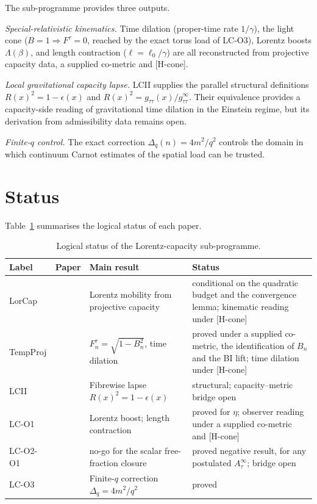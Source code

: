 \documentclass[12pt,a4paper]{article}
\theoremstyle{remark}
\begin{document}
    The sub-programme provides three outputs.

    \textit{Special-relativistic kinematics.}
    Time dilation (proper-time rate $1/\gamma$), the light cone ($B = 1 \Rightarrow F^\tau = 0$, reached by the
    exact torus load of LC-O3),
    Lorentz boosts $\Lambda(\beta)$, and length contraction ($\ell = \ell_0/\gamma$) are all
    reconstructed from projective capacity data, a supplied co-metric and [H-cone].

    \textit{Local gravitational capacity lapse.}
    LCII supplies the parallel structural definitions
    $R(x)^2 = 1-\epsilon(x)$ and $R(x)^2 = g_{\tau\tau}(x)/g_{\tau\tau}^\infty$.
    Their equivalence provides a capacity-side reading of gravitational time dilation in the
    Einstein regime, but its derivation from admissibility data remains open.

    \textit{Finite-$q$ control.}
    The exact correction $\Delta_q(n) = 4m^2/q^2$ controls the domain in which continuum Carnot
    estimates of the spatial load can be trusted.

  \section{Status}
  \label{sec:status}

  Table~\ref{tab:status} summarises the logical status of each paper.

  \begin{table}[h]
    \centering
    \caption{Logical status of the Lorentz-capacity sub-programme.}
    \label{tab:status}
    \smallskip
    \footnotesize
    \begin{tabular}{llp{4.5cm}p{4cm}}
      \toprule
      Label & Paper & Main result & Status \\
      \midrule
      LorCap & \cite{Beau2026n} & Lorentz mobility from projective capacity
      & conditional on the quadratic budget and the convergence lemma; kinematic reading under [H-cone] \\
      TempProj & \cite{Beau2026tp} & $F^\tau_n = \sqrt{1-B_n^2}$, time dilation
      & proved under a supplied co-metric, the identification of $B_n$ and the BI lift; time dilation under
      [H-cone] \\
      LCII & \cite{Beau2026lco2} & Fibrewise lapse $R(x)^2 = 1-\epsilon(x)$
      & structural; capacity--metric bridge open \\
      LC-O1 & \cite{Beau2026lco1} & Lorentz boost; length contraction
      & proved for $\eta$; observer reading under a supplied co-metric and [H-cone] \\
      LC-O2-O1 & \cite{Beau2026lco2o1} & no-go for the scalar free-fraction closure
      & proved negative result, for any postulated $A_\tau^\infty$; bridge open \\
      LC-O3 & \cite{Beau2026lco3} & Finite-$q$ correction $\Delta_q = 4m^2/q^2$
      & proved \\
      \bottomrule
    \end{tabular}
  \end{table}
\end{document}
